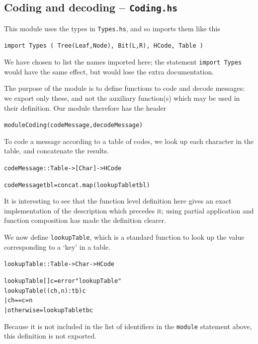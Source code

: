 \subsection*{Coding and decoding -- \texttt{Coding.hs}}

This module uses the types in \texttt{Types.hs}, and so imports them like this
\begin{alltt}
\mbox{import Types ( Tree(Leaf,Node), Bit(L,R), HCode, Table )}
\end{alltt}
We have chosen to list the names imported here; the statement \texttt{import
Types} would have the same effect, but would lose the extra documentation.

The purpose of the module is to define functions to code and decode
messages: we export only these, and not the auxiliary function(s) which may
be used in their definition. Our module therefore has the header
\begin{alltt}
module Coding ( codeMessage , decodeMessage ) 
\end{alltt}
To code a message according to a table of
codes, we look up each character in the table, and concatenate the results.
\begin{alltt}
codeMessage :: Table -> [Char] -> HCode

codeMessage tbl = concat . map (lookupTable tbl)
\end{alltt}
It is interesting to see that the function level definition here gives an
exact implementation of the description which precedes it; using partial
application and function composition has made the definition clearer.

We now define \texttt{lookupTable}, which is a standard
function to look up the value corresponding to a `key' in a table.
\begin{alltt}
lookupTable :: Table -> Char -> HCode

lookupTable [] c = error "lookupTable"
lookupTable ((ch,n):tb) c
  | ch==c       = n
  | otherwise   = lookupTable tb c 
\end{alltt}
Because it is not included in the list of identifiers in the  \texttt{module} statement above, this definition is not exported.

